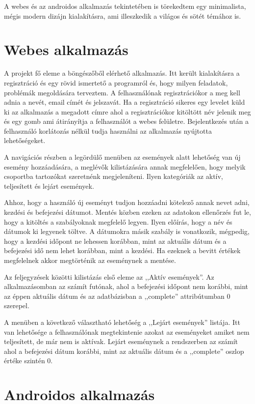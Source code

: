 \documentclass[
]{thesis-ekf}
\theoremstyle{definition}
\theoremstyle{remark}
\begin{document}
A webes és az androidos alkalmazás tekintetében is törekedtem egy minimalista, mégis modern dizájn kialakításra, ami illeszkedik a világos és sötét témához is.
\section{Webes alkalmazás}
A projekt fő eleme a böngészőből elérhető alkalmazás. Itt került kialakításra a regisztráció és egy rövid ismertető a programról és, hogy milyen feladatok, problémák megoldására terveztem. A felhasználónak regisztrációkor a meg kell adnia a nevét, email címét és jelszavát. Ha a regisztráció sikeres egy levelet küld ki az alkalmazás a megadott címre ahol a regisztrációkor kitöltött név jelenik meg és egy gomb ami átirányítja a felhasználót a webes felületre. Bejelentkezés után a felhasználó korlátozás nélkül tudja használni az alkalmazás nyújtotta lehetőségeket. 

A navigációs részben a legördülő menüben az események alatt lehetőség van új esemény hozzáadására, a meglévők kilistázására annak megfelelően, hogy melyik csoportba tartozókat szeretnénk megjeleníteni. Ilyen kategóriák az aktív, teljesített és lejárt események. 

Ahhoz, hogy a használó új eseményt tudjon hozzáadni kötelező annak nevet adni, kezdési és befejezési dátumot. Mentés közben ezeken az adatokon ellenőrzés fut le, hogy a kitöltés a szabályoknak megfelelő legyen. Ilyen előírás, hogy a név és dátumok ki legyenek töltve. A dátumokra másik szabály is vonatkozik, mégpedig, hogy a kezdési időpont ne lehessen korábban, mint az aktuális dátum és a befejezési idő nem lehet korábban, mint a kezdési. Ha ezeknek a bevitt értékek megfelelnek akkor megtörténik az eseménynek a mentése. 

Az feljegyzések közötti kilistázás első eleme az ,,Aktív események''. Az alkalmazásomban az számít futónak, ahol a befejezési időpont nem korábbi, mint az éppen aktuális dátum és az adatbázisban a ,,complete''  attribútumban 0 szerepel.

A menüben a következő választható lehetőség a ,,Lejárt események'' listája. Itt van lehetősége a felhasználónak megtekintenie azokat az eseményeket amiket nem teljesített, de már nem is aktívak. Lejárt eseménynek a rendszerben az számít ahol a befejezési dátum korábbi, mint az aktuális dátum és a ,,complete'' oszlop értéke szintén 0. 

\section{Androidos alkalmazás}
\end{document}
